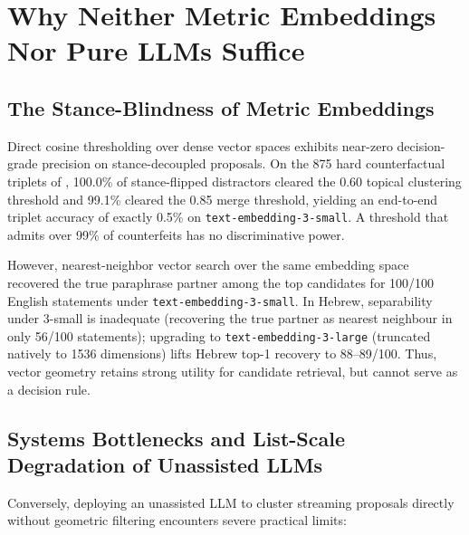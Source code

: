 \documentclass{article}
\begin{document}
\section{Why Neither Metric Embeddings Nor Pure LLMs Suffice}

\subsection{The Stance-Blindness of Metric Embeddings}

Direct cosine thresholding over dense vector spaces exhibits near-zero decision-grade precision on stance-decoupled proposals. On the 875 hard counterfactual triplets of \citet{blair2026embeddings}, 100.0\% of stance-flipped distractors cleared the 0.60 topical clustering threshold and 99.1\% cleared the 0.85 merge threshold, yielding an end-to-end triplet accuracy of exactly 0.5\% on \texttt{text-embedding-3-small}. A threshold that admits over 99\% of counterfeits has no discriminative power.

However, nearest-neighbor vector search over the same embedding space recovered the true paraphrase partner among the top candidates for 100/100 English statements under \texttt{text-embedding-3-small}. In Hebrew, separability under 3-small is inadequate (recovering the true partner as nearest neighbour in only 56/100 statements); upgrading to \texttt{text-embedding-3-large} (truncated natively to 1536 dimensions) lifts Hebrew top-1 recovery to 88--89/100. Thus, vector geometry retains strong utility for candidate retrieval, but cannot serve as a decision rule.

\subsection{Systems Bottlenecks and List-Scale Degradation of Unassisted LLMs}
\label{sec:llmfail}

Conversely, deploying an unassisted LLM to cluster streaming proposals directly without geometric filtering encounters severe practical limits:
\end{document}
